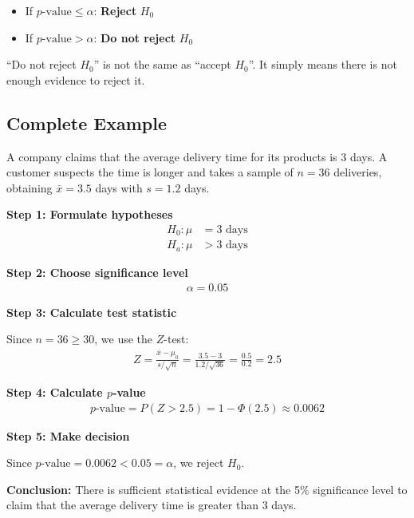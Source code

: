 \begin{itemize}
	\item If $p\text{-value} \leq \alpha$: \textbf{Reject} $H_0$
	\item If $p\text{-value} > \alpha$: \textbf{Do not reject} $H_0$
\end{itemize}

\begin{observacion}
	``Do not reject $H_0$'' is not the same as ``accept $H_0$''. It simply means there is not enough evidence to reject it.
\end{observacion}

\subsection{Complete Example}

A company claims that the average delivery time for its products is 3 days. A customer suspects the time is longer and takes a sample of $n = 36$ deliveries, obtaining $\bar{x} = 3.5$ days with $s = 1.2$ days.

\textbf{Step 1: Formulate hypotheses}
\begin{align}
	H_0: \mu &= 3 \text{ days} \\
	H_a: \mu &> 3 \text{ days}
\end{align}

\textbf{Step 2: Choose significance level}
\begin{align}
	\alpha = 0.05
\end{align}

\textbf{Step 3: Calculate test statistic}

Since $n = 36 \geq 30$, we use the $Z$-test:
\begin{align}
	Z = \frac{\bar{x} - \mu_0}{s/\sqrt{n}} = \frac{3.5 - 3}{1.2/\sqrt{36}} = \frac{0.5}{0.2} = 2.5
\end{align}

\textbf{Step 4: Calculate $p$-value}
\begin{align}
	p\text{-value} = P(Z > 2.5) = 1 - \Phi(2.5) \approx 0.0062
\end{align}

\textbf{Step 5: Make decision}

Since $p\text{-value} = 0.0062 < 0.05 = \alpha$, we reject $H_0$.

\textbf{Conclusion:} There is sufficient statistical evidence at the 5\% significance level to claim that the average delivery time is greater than 3 days.

